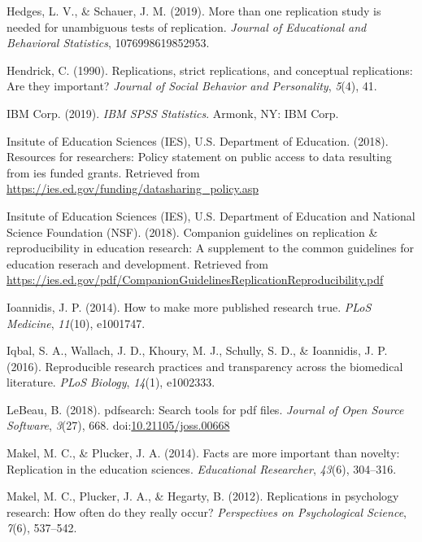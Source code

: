 \documentclass[english,,man]{apa6}
\begin{document}
\leavevmode\hypertarget{ref-hedges2019}{}%
Hedges, L. V., \& Schauer, J. M. (2019). More than one replication study is needed for unambiguous tests of replication. \emph{Journal of Educational and Behavioral Statistics}, 1076998619852953.

\leavevmode\hypertarget{ref-hendrick1990}{}%
Hendrick, C. (1990). Replications, strict replications, and conceptual replications: Are they important? \emph{Journal of Social Behavior and Personality}, \emph{5}(4), 41.

\leavevmode\hypertarget{ref-spss}{}%
IBM Corp. (2019). \emph{IBM SPSS Statistics}. Armonk, NY: IBM Corp.

\leavevmode\hypertarget{ref-iesdata}{}%
Insitute of Education Sciences (IES), U.S. Department of Education. (2018). Resources for researchers: Policy statement on public access to data resulting from ies funded grants. Retrieved from \url{https://ies.ed.gov/funding/datasharing_policy.asp}

\leavevmode\hypertarget{ref-iesrepro}{}%
Insitute of Education Sciences (IES), U.S. Department of Education and National Science Foundation (NSF). (2018). Companion guidelines on replication \& reproducibility in education research: A supplement to the common guidelines for education reserach and development. Retrieved from \url{https://ies.ed.gov/pdf/CompanionGuidelinesReplicationReproducibility.pdf}

\leavevmode\hypertarget{ref-ioannidis2014}{}%
Ioannidis, J. P. (2014). How to make more published research true. \emph{PLoS Medicine}, \emph{11}(10), e1001747.

\leavevmode\hypertarget{ref-iqbal2016}{}%
Iqbal, S. A., Wallach, J. D., Khoury, M. J., Schully, S. D., \& Ioannidis, J. P. (2016). Reproducible research practices and transparency across the biomedical literature. \emph{PLoS Biology}, \emph{14}(1), e1002333.

\leavevmode\hypertarget{ref-pdfsearch}{}%
LeBeau, B. (2018). pdfsearch: Search tools for pdf files. \emph{Journal of Open Source Software}, \emph{3}(27), 668. doi:\href{https://doi.org/10.21105/joss.00668}{10.21105/joss.00668}

\leavevmode\hypertarget{ref-makel2014}{}%
Makel, M. C., \& Plucker, J. A. (2014). Facts are more important than novelty: Replication in the education sciences. \emph{Educational Researcher}, \emph{43}(6), 304--316.

\leavevmode\hypertarget{ref-makel2012}{}%
Makel, M. C., Plucker, J. A., \& Hegarty, B. (2012). Replications in psychology research: How often do they really occur? \emph{Perspectives on Psychological Science}, \emph{7}(6), 537--542.
\end{document}
